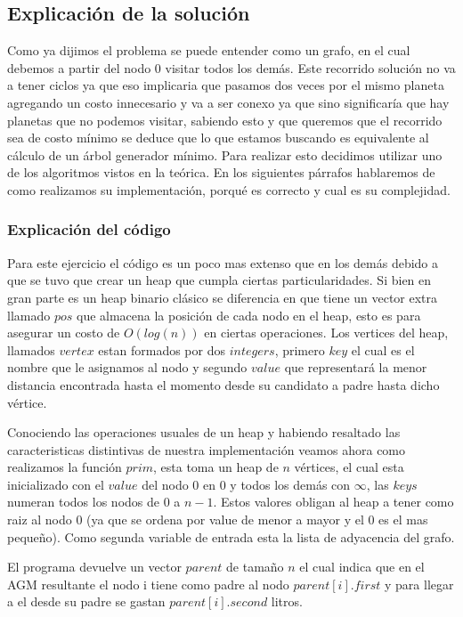 \subsection{Explicación de la solución}

Como ya dijimos el problema se puede entender como un grafo, en el cual debemos a partir del nodo 0 visitar todos los demás. Este recorrido solución no va a tener ciclos ya que eso implicaria que pasamos dos veces por el mismo planeta agregando un costo innecesario y va a ser conexo ya que sino significaría que hay planetas que no podemos visitar, sabiendo esto y que queremos que el recorrido sea de costo mínimo se deduce que lo que estamos buscando es equivalente al cálculo de un árbol generador mínimo. Para realizar esto decidimos utilizar uno de los algoritmos vistos en la teórica. En los siguientes párrafos hablaremos de como realizamos su implementación, porqué es correcto y cual es su complejidad.

\subsubsection{Explicación del código}

Para este ejercicio el código es un poco mas extenso que en los demás debido a que se tuvo que crear un heap que cumpla ciertas particularidades. Si bien en gran parte es un heap binario clásico se diferencia en que tiene un vector extra llamado $pos$ que almacena la posición de cada nodo en el heap, esto es para asegurar un costo de $O(log(n))$ en ciertas operaciones. Los vertices del heap, llamados $vertex$ estan formados por dos $integers$, primero $key$ el cual es el nombre que le asignamos al nodo y segundo $value$ que representará la menor distancia encontrada hasta el momento desde su candidato a padre hasta dicho vértice.

Conociendo las operaciones usuales de un heap y habiendo resaltado las caracteristicas distintivas de nuestra implementación veamos ahora como realizamos la función $prim$, esta toma un heap de $n$ vértices, el cual esta inicializado con el $value$ del nodo $0$ en $0$ y todos los demás con $\infty$, las $keys$ numeran todos los nodos de $0$ a $n-1$. Estos valores obligan al heap a tener como raiz al nodo 0 (ya que se ordena por value de menor a mayor y el 0 es el mas pequeño). Como segunda variable de entrada esta la lista de adyacencia del grafo.

El programa devuelve un vector $parent$ de tamaño $n$ el cual indica que en el AGM resultante el nodo i tiene como padre al nodo $parent[i].first$ y para llegar a el desde su padre se gastan $parent[i].second$ litros.

